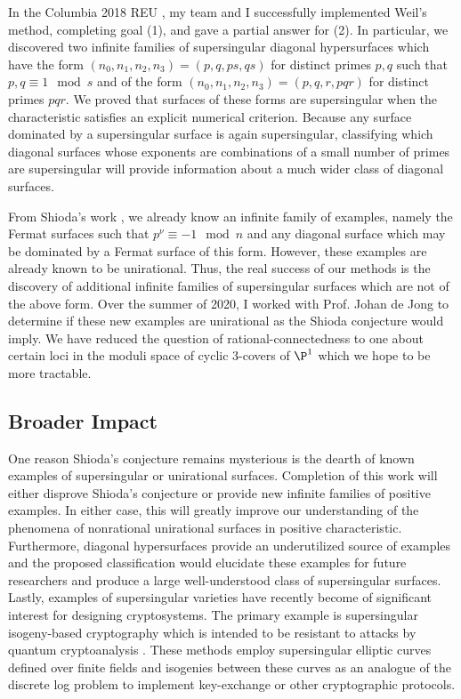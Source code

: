 \documentclass[11pt]{amsart}
\begin{document}
In the Columbia 2018 REU \cite{REU}, my team and I successfully implemented Weil's method, completing goal (1), and gave a partial answer for (2). In particular, we discovered two infinite families of supersingular diagonal hypersurfaces which have the form $(n_0, n_1, n_2, n_3) = (p, q, ps, qs)$ for distinct primes $p,q$ such that $p,q \equiv 1 \mod s$ and of the form $(n_0, n_1, n_2, n_3) = (p, q, r, pqr)$ for distinct primes $pqr$. We proved that surfaces of these forms are supersingular when the characteristic satisfies an explicit numerical criterion. Because any surface dominated by a supersingular surface is again supersingular, classifying which diagonal surfaces whose exponents are combinations of a small number of primes are supersingular will provide information about a much wider class of diagonal surfaces.  
\par
From Shioda's work \cite{shioda_on_fermat}, we already know an infinite family of examples, namely the Fermat surfaces such that $p^\nu \equiv - 1 \mod n$ and any diagonal surface which may be dominated by a Fermat surface of this form. However, these examples are already known to be unirational. Thus, the real success of our methods is the discovery of additional infinite families of supersingular surfaces which are not of the above form. Over the summer of 2020, I worked with Prof. Johan de Jong to determine if these new examples are unirational as the Shioda conjecture would imply. We have reduced the question of rational-connectedness to one about certain loci in the moduli space of cyclic $3$-covers of $\P^1$ which we hope to be more tractable. 

\subsection*{Broader Impact}

One reason Shioda's conjecture remains mysterious is the dearth of known examples of supersingular or unirational surfaces. Completion of this work will either disprove Shioda's conjecture or provide new infinite families of positive examples. In either case, this will greatly improve our understanding of the phenomena of nonrational unirational surfaces in positive characteristic. Furthermore, diagonal hypersurfaces provide an underutilized source of examples and the proposed classification would elucidate these examples for future researchers and produce a large well-understood class of supersingular surfaces. Lastly, examples of supersingular varieties have recently become of significant interest for designing cryptosystems. The primary example is supersingular isogeny-based cryptography which is intended to be resistant to attacks by quantum cryptoanalysis \cite{feo_supersingular_isogeny_crypto}. These methods employ supersingular elliptic curves defined over finite fields and isogenies between these curves as an analogue of the discrete log problem to implement key-exchange or other cryptographic protocols. 






\end{document}
